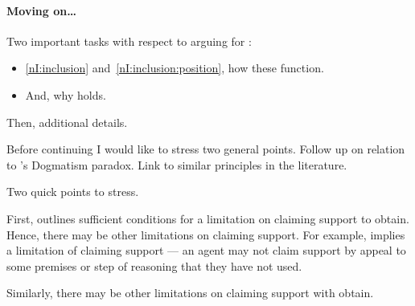 \paragraph{Moving on\dots}

\begin{note}[Task]
  Two important tasks with respect to arguing for \nI{}:

  \begin{itemize}
  \item \ref{nI:inclusion} and~\ref{nI:inclusion:position}, how these function.
  \item And, why \nI{} holds.
  \end{itemize}

  Then, additional details.
\end{note}

\begin{note}
  Before continuing I would like to stress two general points.
  Follow up on relation to \citeauthor{Kripke:2011wv}'s Dogmatism paradox.
  Link to similar principles in the literature.
\end{note}

\begin{note}
  Two quick points to stress.
\end{note}

\begin{note}
  First, \nI{} outlines sufficient conditions for a limitation on claiming support to obtain.
  Hence, there may be other limitations on claiming support.
  For example, \ESU{} implies a limitation of claiming support --- an agent may not claim support by appeal to some premises or step of reasoning that they have not used.

  Similarly, there may be other limitations on claiming support with obtain.
\end{note}

